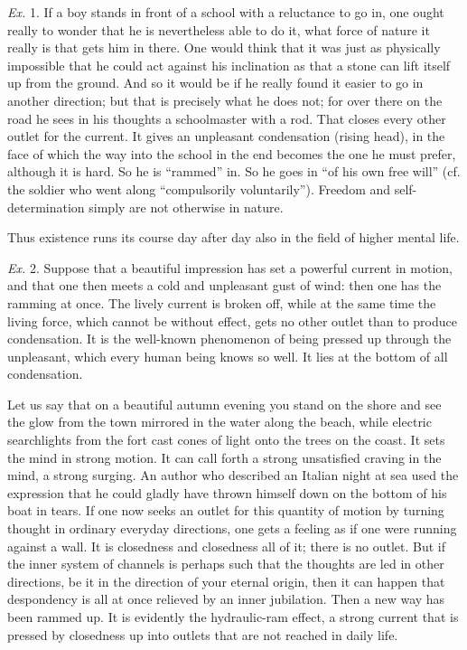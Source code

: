 \documentclass[12pt,a4paper,openany]{book}
\newcommand{\opage}[1]{\marginnote{\footnotesize\textit{[#1]}}}
\begin{document}
\emph{Ex.} 1. If a boy stands in front of a school with a reluctance to go
in, one ought really to wonder that he is nevertheless
able to do it, what force of nature it really is that
gets him in there. One would think that it was just as physically
impossible that he could act against his inclination as that
\setcounter{footnote}{0}%
\opage{290}a stone can lift itself up from the ground. And so it would
be if he really found it easier to go in another direction;
but that is precisely what he does not; for over there on the road
he sees in his thoughts a schoolmaster with a rod. That closes every
other outlet for the current. It gives an unpleasant condensation
(rising head), in the face of which the way into the school in the end
becomes the one he must prefer, although it is
hard. So he is ``rammed'' in. So he goes in ``of his own free will''
(cf. the soldier who went along ``compulsorily voluntarily''). Freedom and self-determination
simply are not otherwise in nature.

Thus existence runs its course day after day also in the field of
higher mental life.

\emph{Ex.} 2. Suppose that a beautiful impression has set a powerful
current in motion, and that one then meets a cold and unpleasant
gust of wind: then one has the ramming at once. The lively
current is broken off, while at the same time the living force, which
cannot be without effect, gets no other outlet than to produce
condensation. It is the well-known phenomenon of being pressed up
through the unpleasant, which every human being knows so well. It
lies at the bottom of all condensation.

Let us say that on a beautiful autumn evening you stand on the shore
and see the glow from the town mirrored in the water along
the beach, while electric searchlights from the fort cast
cones of light onto the trees on the coast. It sets the mind in
strong motion. It can call forth a strong unsatisfied
craving in the mind, a strong surging. An author who described
an Italian night at sea used the expression that he could
gladly have thrown himself down on the bottom of his boat in tears.
If one now seeks an outlet for this quantity of motion by turning
thought in ordinary everyday directions, one gets
a feeling as if one were running against a wall. It is closedness
and closedness all of it; there is no outlet. But if the inner
system of channels is perhaps such that the thoughts are led in other
directions, be it in the direction of your eternal origin, then
it can happen that despondency is all at once relieved by an inner jubilation.
\setcounter{footnote}{0}%
\opage{291}Then a new way has been rammed up. It is evidently the hydraulic-ram effect,
a strong current that is pressed by closedness up into
outlets that are not reached in daily life.
\end{document}
